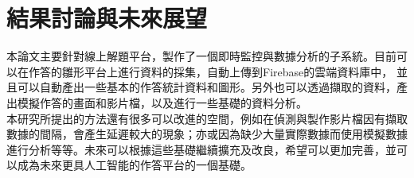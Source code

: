 \chapter{結果討論與未來展望}
本論文主要針對線上解題平台，製作了一個即時監控與數據分析的子系統。目前可以在作答的雛形平台上進行資料的採集，自動上傳到Firebase的雲端資料庫中，
並且可以自動產出一些基本的作答統計資料和圖形。另外也可以透過擷取的資料，產出模擬作答的畫面和影片檔，以及進行一些基礎的資料分析。\\
本研究所提出的方法還有很多可以改進的空間，例如在偵測與製作影片檔因有擷取數據的間隔，會產生延遲較大的現象；亦或因為缺少大量實際數據而使用模擬數據進行分析等等。未來可以根據這些基礎繼續擴充及改良，希望可以更加完善，並可以成為未來更具人工智能的作答平台的一個基礎。
